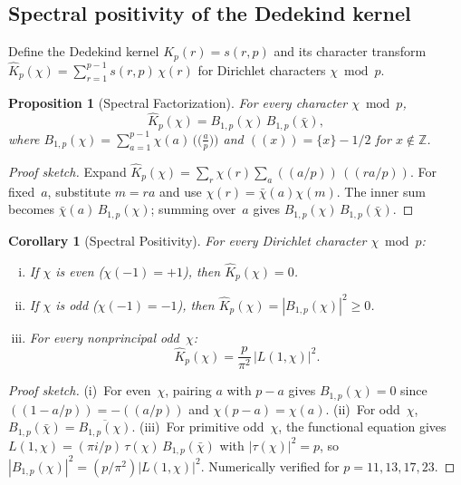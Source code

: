 \documentclass[11pt]{article}
\newtheorem{proposition}[theorem]{Proposition}
\newtheorem{corollary}[theorem]{Corollary}
\theoremstyle{definition}
\newcommand{\Z}{\mathbb{Z}}
\begin{document}
\subsection{Spectral positivity of the Dedekind kernel}

Define the Dedekind kernel $K_p(r) = s(r,p)$ and its
character transform
$\hat{K}_p(\chi) = \sum_{r=1}^{p-1} s(r,p)\,\chi(r)$
for Dirichlet characters $\chi \bmod p$.

\begin{proposition}[Spectral Factorization]\label{prop:spectral-factor}
For every character $\chi \bmod p$,
\[
  \hat{K}_p(\chi) = B_{1,p}(\chi)\,B_{1,p}(\bar{\chi}),
\]
where $B_{1,p}(\chi) = \sum_{a=1}^{p-1}\chi(a)\,\bigl(\!\bigl(\tfrac{a}{p}\bigr)\!\bigr)$
and $((x)) = \{x\} - 1/2$ for $x \notin \Z$.
\end{proposition}

\begin{proof}[Proof sketch]
Expand $\hat{K}_p(\chi) = \sum_r \chi(r) \sum_a ((a/p))\,((ra/p))$.
For fixed~$a$, substitute $m = ra$ and use $\chi(r) = \bar{\chi}(a)\chi(m)$.
The inner sum becomes $\bar{\chi}(a)\,B_{1,p}(\chi)$; summing over~$a$
gives $B_{1,p}(\chi)\,B_{1,p}(\bar{\chi})$.
\end{proof}

\begin{corollary}[Spectral Positivity]\label{cor:spectral-pos}
For every Dirichlet character $\chi \bmod p$:
\begin{enumerate}[(i)]
  \item If $\chi$ is even ($\chi(-1) = +1$), then $\hat{K}_p(\chi) = 0$.
  \item If $\chi$ is odd ($\chi(-1) = -1$), then
    $\hat{K}_p(\chi) = |B_{1,p}(\chi)|^2 \ge 0$.
  \item For every nonprincipal odd~$\chi$:
    \begin{equation}\label{eq:spectral-L}
      \hat{K}_p(\chi) = \frac{p}{\pi^2}\,|L(1,\chi)|^2.
    \end{equation}
\end{enumerate}
\end{corollary}

\begin{proof}[Proof sketch]
(i)~For even~$\chi$, pairing $a$ with $p-a$ gives $B_{1,p}(\chi) = 0$
since $((1-a/p)) = -((a/p))$ and $\chi(p-a) = \chi(a)$.
(ii)~For odd~$\chi$, $B_{1,p}(\bar\chi) = \overline{B_{1,p}(\chi)}$.
(iii)~For primitive odd~$\chi$, the functional equation gives
$L(1,\chi) = (\pi i/p)\,\tau(\chi)\,B_{1,p}(\bar\chi)$
with $|\tau(\chi)|^2 = p$, so
$|B_{1,p}(\chi)|^2 = (p/\pi^2)|L(1,\chi)|^2$.
Numerically verified for $p = 11, 13, 17, 23$.
\end{proof}
\end{document}
